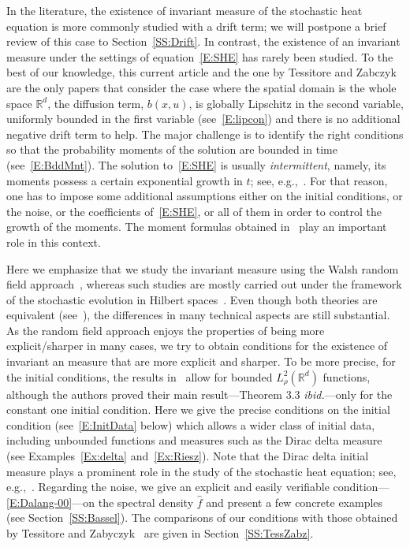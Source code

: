 \documentclass[a4paper,11pt]{article}%
\theoremstyle{plain}
\theoremstyle{definition}
\numberwithin{equation}{section}
\newcommand{\R}{\mathbb{R}}
\begin{document}
In the literature, the existence of invariant measure of the stochastic heat equation is more
commonly studied with a drift term; we will postpone a brief review of this case to
Section~\ref{SS:Drift}. In contrast, the existence of an invariant measure under the settings of
equation~\eqref{E:SHE} has rarely been studied. To the best of our knowledge, this current article
and the one by Tessitore and Zabczyk~\cite{tessitore.zabczyk:98:invariant} are the only papers that
consider the case where the spatial domain is the whole space $\R^d$, the diffusion term, $b(x,u)$,
is globally Lipschitz in the second variable, uniformly bounded in the first variable (see~\eqref{E:lipcon})
and there is no additional negative drift term to help. The major challenge is to identify the right
conditions so that the probability moments of the solution are bounded in time
(see~\eqref{E:BddMnt}). The solution to~\eqref{E:SHE} is usually \textit{intermittent}, namely, its
moments possess a certain exponential growth in $t$; see,
e.g.,~\cite{carmona.molchanov:94:parabolic,foondun.khoshnevisan:09:intermittence}. For that reason,
one has to impose some additional assumptions either on the initial conditions, or the noise, or the
coefficients of~\eqref{E:SHE}, or all of them in order to control the growth of the moments. The
moment formulas obtained in~\cite{chen.huang:19:comparison,chen.kim:19:nonlinear} play an important
role in this context.

Here we emphasize that we study the invariant measure using the Walsh random field
approach~\cite{walsh:86:introduction}, whereas such studies are mostly carried out under the
framework of the stochastic evolution in Hilbert spaces~\cite{da-prato.zabczyk:14:stochastic}. Even
though both theories are equivalent (see~\cite{dalang.quer-sardanyons:11:stochastic}), the
differences in many technical aspects are still substantial. As the random field approach enjoys the
properties of being more explicit/sharper in many cases, we try to obtain conditions for the
existence of invariant an measure that are more explicit and sharper. To be more precise, for the
initial conditions, the results in~\cite{tessitore.zabczyk:98:invariant} allow for bounded $L_\rho^2 (\R^d)$
functions, although the authors proved their main result---Theorem 3.3
\textit{ibid.}---only for the constant one initial condition. Here we give the precise conditions on
the initial condition (see~\eqref{E:InitData} below) which allows a wider class of initial data,
including unbounded functions and measures such as the Dirac delta measure (see
Examples~\ref{Ex:delta} and~\ref{Ex:Riesz}). Note that the Dirac delta initial measure plays a
prominent role in the study of the stochastic heat equation; see,
e.g.,~\cite{amir.corwin.ea:11:probability}. Regarding the noise, we give an explicit and easily
verifiable condition---\eqref{E:Dalang-00}---on the spectral density $\widehat{f}$ and present a few
concrete examples (see Section~\ref{SS:Bassel}). The comparisons of our conditions with those
obtained by Tessitore and Zabyczyk~\cite{tessitore.zabczyk:98:invariant} are given in
Section~\ref{SS:TessZabz}.
\end{document}
